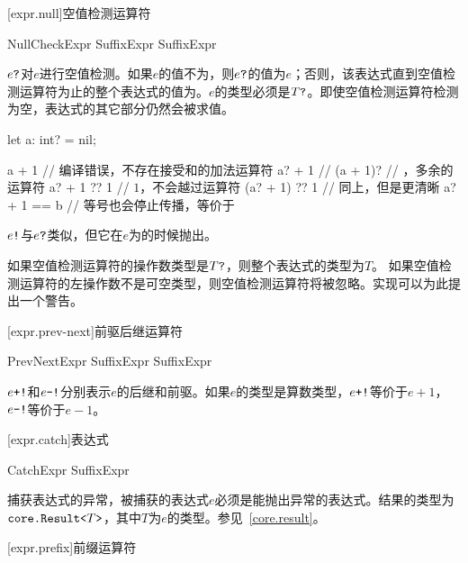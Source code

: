 [expr.null]{空值检测运算符}

\begin{bnf}{NullCheckExpr}
    SuffixExpr  \br
    SuffixExpr \terminal{!}
\end{bnf}

\pnum
$e\texttt{?}$对$e$进行空值检测。如果$e$的值不为，则$e\texttt{?}$的值为$e$；否则，该表达式直到空值检测运算符为止的整个表达式的值为。$e$的类型必须是$T\texttt{?}$。即使空值检测运算符检测为空，表达式的其它部分仍然会被求值。

\enterexample
\begin{codeblock}
let a: int? = nil;

a + 1 // 编译错误，不存在接受和的加法运算符
a? + 1 // 
(a + 1)? // ，多余的运算符
a? + 1 ?? 1 // $1$，不会越过运算符
(a? + 1) ?? 1 // 同上，但是更清晰
a? + 1 == b // 等号也会停止传播，等价于
\end{codeblock}
\exitexample

\pnum
$e\texttt{!}$与$e\texttt{?}$类似，但它在$e$为的时候抛出。

\pnum
如果空值检测运算符的操作数类型是$T\texttt{?}$，则整个表达式的类型为$T$。
如果空值检测运算符的左操作数不是可空类型，则空值检测运算符将被忽略。实现可以为此提出一个警告。

[expr.prev-next]{前驱后继运算符}

\begin{bnf}{PrevNextExpr}
    SuffixExpr \terminal{+!} \br
    SuffixExpr \terminal{-!}
\end{bnf}

\pnum
$e\texttt{+!}$和$e\texttt{-!}$分别表示$e$的后继和前驱。如果$e$的类型是算数类型，$e\texttt{+!}$等价于$e+1$，$e\texttt{-!}$等价于$e-1$。

[expr.catch]{表达式}

\begin{bnf}{CatchExpr}
    SuffixExpr  
\end{bnf}

\pnum
{}捕获表达式的异常，被捕获的表达式$e$必须是能抛出异常的表达式。结果的类型为$\texttt{core.Result<}T\texttt{>}$，其中$T$为$e$的类型。参见~\ref{core.result}。

[expr.prefix]{前缀运算符}

